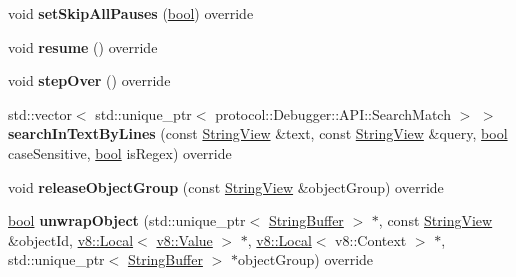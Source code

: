 \begin{DoxyCompactItemize}
void {\bfseries set\+Skip\+All\+Pauses} (\mbox{\hyperlink{classbool}{bool}}) override
\item 
\mbox{\label{classv8__inspector_1_1V8InspectorSessionImpl_a38b046db68032f4e2461ca050102655b}} 
void {\bfseries resume} () override
\item 
\mbox{\label{classv8__inspector_1_1V8InspectorSessionImpl_aec2ad1cf3a986a15c476d7efa14fb3e9}} 
void {\bfseries step\+Over} () override
\item 
\mbox{\label{classv8__inspector_1_1V8InspectorSessionImpl_ac82faedc3d7fdc8a481515cb8c8c8476}} 
std\+::vector$<$ std\+::unique\+\_\+ptr$<$ protocol\+::\+Debugger\+::\+A\+P\+I\+::\+Search\+Match $>$ $>$ {\bfseries search\+In\+Text\+By\+Lines} (const \mbox{\hyperlink{classv8__inspector_1_1StringView}{String\+View}} \&text, const \mbox{\hyperlink{classv8__inspector_1_1StringView}{String\+View}} \&query, \mbox{\hyperlink{classbool}{bool}} case\+Sensitive, \mbox{\hyperlink{classbool}{bool}} is\+Regex) override
\item 
\mbox{\label{classv8__inspector_1_1V8InspectorSessionImpl_ab78c300370733ae3f76b48e32a7f76cc}} 
void {\bfseries release\+Object\+Group} (const \mbox{\hyperlink{classv8__inspector_1_1StringView}{String\+View}} \&object\+Group) override
\item 
\mbox{\label{classv8__inspector_1_1V8InspectorSessionImpl_a14305e3314bb76e55022cea0ae9936a1}} 
\mbox{\hyperlink{classbool}{bool}} {\bfseries unwrap\+Object} (std\+::unique\+\_\+ptr$<$ \mbox{\hyperlink{classv8__inspector_1_1StringBuffer}{String\+Buffer}} $>$ $\ast$, const \mbox{\hyperlink{classv8__inspector_1_1StringView}{String\+View}} \&object\+Id, \mbox{\hyperlink{classv8_1_1Local}{v8\+::\+Local}}$<$ \mbox{\hyperlink{classv8_1_1Value}{v8\+::\+Value}} $>$ $\ast$, \mbox{\hyperlink{classv8_1_1Local}{v8\+::\+Local}}$<$ v8\+::\+Context $>$ $\ast$, std\+::unique\+\_\+ptr$<$ \mbox{\hyperlink{classv8__inspector_1_1StringBuffer}{String\+Buffer}} $>$ $\ast$object\+Group) override
\item 
\mbox{\label{classv8__inspector_1_1V8InspectorSessionImpl_a00be1f7edaba27c032bb05762c33e943}} 

\end{DoxyCompactItemize}
